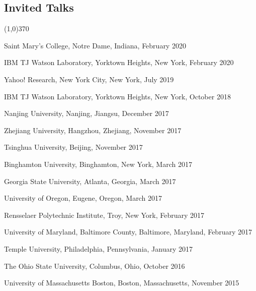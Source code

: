 \documentclass[10pt]{article}
\newenvironment{myindentpar}[1]%
{\begin{list}{}%
         {\setlength{\leftmargin}{#1}}%
         \item[]%
}
{\end{list}}
\newcounter{list}
\begin{document}
\subsection{\sc Invited Talks}
\vspace{-0.4cm} \line(1,0){370} \vspace{-0.1cm}

\begin{myindentpar}{0.75cm}

\hspace{-0.75cm} Saint Mary's College, Notre Dame, Indiana, February 2020
	
\hspace{-0.75cm} IBM TJ Watson Laboratory, Yorktown Heights, New York, February 2020
	
\hspace{-0.75cm} Yahoo! Research, New York City, New York, July 2019

\hspace{-0.75cm} IBM TJ Watson Laboratory, Yorktown Heights, New York, October 2018
	
\hspace{-0.75cm} Nanjing University, Nanjing, Jiangsu, December 2017


\hspace{-0.75cm} Zhejiang University, Hangzhou, Zhejiang, November 2017

\hspace{-0.75cm} Tsinghua University, Beijing, November 2017

\hspace{-0.75cm} Binghamton University, Binghamton, New York, March 2017

\hspace{-0.75cm} Georgia State University, Atlanta, Georgia, March 2017

\hspace{-0.75cm} University of Oregon, Eugene, Oregon, March 2017

\hspace{-0.75cm} Rensselaer Polytechnic Institute, Troy, New York, February 2017

\hspace{-0.75cm} University of Maryland, Baltimore County, Baltimore, Maryland, February 2017

\hspace{-0.75cm} Temple University, Philadelphia, Pennsylvania, January 2017

\hspace{-0.75cm} The Ohio State University, Columbus, Ohio, October 2016

\hspace{-0.75cm} University of Massachusetts Boston, Boston, Massachusetts, November 2015

\end{myindentpar}
\end{document}
